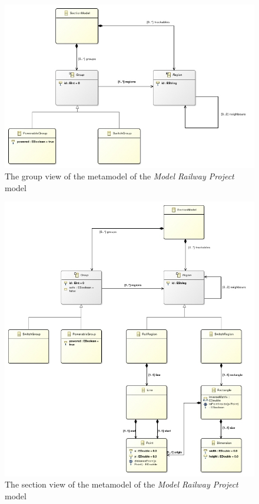 \begin{figure}[H]
	\centering
	\includegraphics[width=1.2\linewidth]{include/figures/chapter_6/metamodels/groupmodel}
	\caption{The group view of the metamodel of the \emph{Model Railway Project} model} 
	\label{fig:case_study:groupmodel}
\end{figure}
\newpage
\begin{figure}[H]
	\centering
	\includegraphics[width=1.2\linewidth]{include/figures/chapter_6/metamodels/sectionmodel}
	\caption{The section view of the metamodel of the \emph{Model Railway Project} model} 
	\label{fig:case_study:sectionmodel}
\end{figure}
